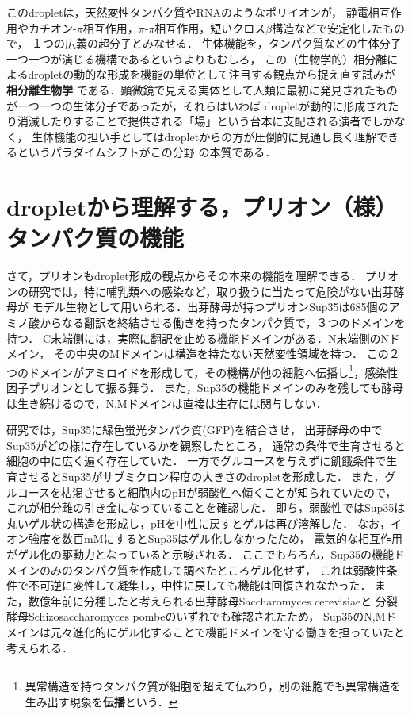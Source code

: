 \documentclass[uplatex,dvipdfmx]{jsarticle}
\begin{document}
このdropletは，天然変性タンパク質やRNAのようなポリイオンが，
静電相互作用やカチオン-$\pi$相互作用，$\pi$-$\pi$相互作用，短いクロス$\beta$構造などで安定化したもので，
１つの広義の超分子とみなせる．
生体機能を，タンパク質などの生体分子一つ一つが演じる機構であるというよりもむしろ，
この（生物学的）相分離によるdropletの動的な形成を機能の単位として注目する観点から捉え直す試みが\textbf{相分離生物学}
である．顕微鏡で見える実体として人類に最初に発見されたものが一つ一つの生体分子であったが，それらはいわば
dropletが動的に形成されたり消滅したりすることで提供される「場」という台本に支配される演者でしかなく，
生体機能の担い手としてはdropletからの方が圧倒的に見通し良く理解できるというパラダイムシフトがこの分野
の本質である．

\section{dropletから理解する，プリオン（様）タンパク質の機能}

さて，プリオンもdroplet形成の観点からその本来の機能を理解できる．
プリオンの研究では，特に哺乳類への感染など，取り扱うに当たって危険がない出芽酵母が
モデル生物として用いられる．出芽酵母が持つプリオンSup35は685個のアミノ酸からなる翻訳を終結させる働きを持ったタンパク質で，３つのドメインを持つ．
C末端側には，実際に翻訳を止める機能ドメインがある．N末端側のNドメイン，
その中央のMドメインは構造を持たない天然変性領域を持つ．
この２つのドメインがアミロイドを形成して，その機構が他の細胞へ伝播し\footnote{異常構造を持つタンパク質が細胞を超えて伝わり，別の細胞でも異常構造を生み出す現象を\textbf{伝播}という．}，感染性因子プリオンとして振る舞う．
また，Sup35の機能ドメインのみを残しても酵母は生き続けるので，N,Mドメインは直接は生存には関与しない．

研究\cite{Yeast Prion}では，Sup35に緑色蛍光タンパク質(GFP)を結合させ，
出芽酵母の中でSup35がどの様に存在しているかを観察したところ，
通常の条件で生育させると細胞の中に広く遍く存在していた．
一方でグルコースを与えずに飢餓条件で生育させるとSup35がサブミクロン程度の大きさのdropletを形成した．
また，グルコースを枯渇させると細胞内のpHが弱酸性へ傾くことが知られていたので，
これが相分離の引き金になっていることを確認した．
即ち，弱酸性ではSup35は丸いゲル状の構造を形成し，pHを中性に戻すとゲルは再び溶解した．
なお，イオン強度を数百mMにするとSup35はゲル化しなかったため，
電気的な相互作用がゲル化の駆動力となっていると示唆される．
ここでもちろん，Sup35の機能ドメインのみのタンパク質を作成して調べたところゲル化せず，
これは弱酸性条件で不可逆に変性して凝集し，中性に戻しても機能は回復されなかった．
また，数億年前に分種したと考えられる出芽酵母Saccharomyces cerevisiaeと
分裂酵母Schizosaccharomyces pombeのいずれでも確認されたため，
Sup35のN,Mドメインは元々進化的にゲル化することで機能ドメインを守る働きを担っていたと考えられる．
\end{document}
